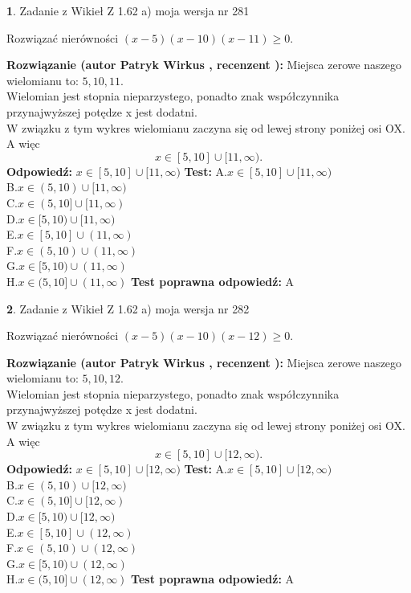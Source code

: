 \documentclass[12pt, a4paper]{article}
\theoremstyle{definition} %
\newtheorem{zad}{}
\newcommand{\zadStart}[1]{\begin{zad}#1\newline}
\newcommand{\zadStop}{\end{zad}}
\newcommand{\rozwStart}[2]{\noindent \textbf{Rozwiązanie (autor #1 , recenzent #2): }\newline}
\newcommand{\rozwStop}{\newline}
\newcommand{\odpStart}{\noindent \textbf{Odpowiedź:}\newline}
\newcommand{\odpStop}{\newline}
\newcommand{\testStart}{\noindent \textbf{Test:}\newline}
\newcommand{\testStop}{\newline}
\newcommand{\kluczStart}{\noindent \textbf{Test poprawna odpowiedź:}\newline}
\newcommand{\kluczStop}{\newline}
\begin{document}
\zadStart{Zadanie z Wikieł Z 1.62 a) moja wersja nr 281}

Rozwiązać nierówności $(x-5)(x-10)(x-11)\ge0$.
\zadStop
\rozwStart{Patryk Wirkus}{}
Miejsca zerowe naszego wielomianu to: $5, 10, 11$.\\
Wielomian jest stopnia nieparzystego, ponadto znak współczynnika przy\linebreak najwyższej potędze x jest dodatni.\\ W związku z tym wykres wielomianu zaczyna się od lewej strony poniżej osi OX. A więc $$x \in [5,10] \cup [11,\infty).$$
\rozwStop
\odpStart
$x \in [5,10] \cup [11,\infty)$
\odpStop
\testStart
A.$x \in [5,10] \cup [11,\infty)$\\
B.$x \in (5,10) \cup [11,\infty)$\\
C.$x \in (5,10] \cup [11,\infty)$\\
D.$x \in [5,10) \cup [11,\infty)$\\
E.$x \in [5,10] \cup (11,\infty)$\\
F.$x \in (5,10) \cup (11,\infty)$\\
G.$x \in [5,10) \cup (11,\infty)$\\
H.$x \in (5,10] \cup (11,\infty)$
\testStop
\kluczStart
A
\kluczStop



\zadStart{Zadanie z Wikieł Z 1.62 a) moja wersja nr 282}

Rozwiązać nierówności $(x-5)(x-10)(x-12)\ge0$.
\zadStop
\rozwStart{Patryk Wirkus}{}
Miejsca zerowe naszego wielomianu to: $5, 10, 12$.\\
Wielomian jest stopnia nieparzystego, ponadto znak współczynnika przy\linebreak najwyższej potędze x jest dodatni.\\ W związku z tym wykres wielomianu zaczyna się od lewej strony poniżej osi OX. A więc $$x \in [5,10] \cup [12,\infty).$$
\rozwStop
\odpStart
$x \in [5,10] \cup [12,\infty)$
\odpStop
\testStart
A.$x \in [5,10] \cup [12,\infty)$\\
B.$x \in (5,10) \cup [12,\infty)$\\
C.$x \in (5,10] \cup [12,\infty)$\\
D.$x \in [5,10) \cup [12,\infty)$\\
E.$x \in [5,10] \cup (12,\infty)$\\
F.$x \in (5,10) \cup (12,\infty)$\\
G.$x \in [5,10) \cup (12,\infty)$\\
H.$x \in (5,10] \cup (12,\infty)$
\testStop
\kluczStart
A
\kluczStop
\end{document}
